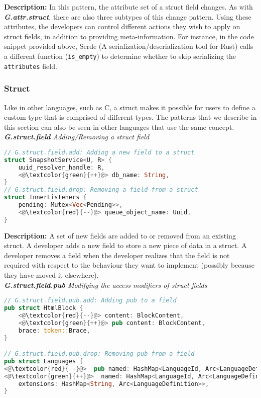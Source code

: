 \noindent\textbf{Description:} In this pattern, the attribute set of a struct field changes. As with \textit{\textbf{G.attr.struct}}, there are also three subtypes of this change pattern. Using these attributes, the developers can control different actions they wish to apply on struct fields, in addition to providing meta-information. For instance, in the code snippet provided above, Serde (A serialization/deserialization tool for Rust) calls a different function (\verb+is_empty+) to determine whether to skip serializing the \verb+attributes+ field.

\subsubsection{Struct} 

Like in other languages, such as C, a struct makes it possible for users to define a custom type that is comprised of different types. The patterns that we describe in this section can also be seen in other languages that use the same concept. \\

\noindent\textit{\textbf{G.struct.field} Adding/Removing a struct field}

\begin{lstlisting}[language=Rust, style=colouredRust]
// G.struct.field.add: Adding a new field to a struct
struct SnapshotService<U, R> {
    uuid_resolver_handle: R,
    <@\textcolor{green}{++}@> db_name: String,
}
// G.struct.field.drop: Removing a field from a struct
struct InnerListeners {
    pending: Mutex<Vec<Pending>>,
    <@\textcolor{red}{--}@> queue_object_name: Uuid,
}

\end{lstlisting}

\noindent\textbf{Description:} A set of new fields are added to or removed from an existing struct. A developer adds a new field to store a new piece of data in a struct. A developer removes a field when the developer realizes that the field is not required with respect to the behaviour they want to implement (possibly because they have moved it elsewhere). \\

\noindent\textit{\textbf{G.struct.field.pub} Modifying the access modifiers of struct fields}

\begin{lstlisting}[language=Rust, style=colouredRust]
// G.struct.field.pub.add: Adding pub to a field
pub struct HtmlBlock {
    <@\textcolor{red}{--}@> content: BlockContent,
    <@\textcolor{green}{++}@> pub content: BlockContent,
    brace: token::Brace,
} 

// G.struct.field.pub.drop: Removing pub from a field
pub struct Languages {
<@\textcolor{red}{--}@>  pub named: HashMap<LanguageId, Arc<LanguageDefinition>>,
<@\textcolor{green}{++}@>  named: HashMap<LanguageId, Arc<LanguageDefinition>>,
    extensions: HashMap<String, Arc<LanguageDefinition>>,
}

\end{lstlisting}

